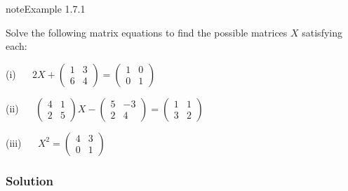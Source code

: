 \documentclass[letterpaper,10pt,english]{jupyterBook}
\begin{document}
\begin{sphinxadmonition}{note}{Example 1.7.1}



\sphinxAtStartPar
Solve the following matrix equations to find the possible matrices \(X\) satisfying each:

\sphinxAtStartPar
(i)   \(2X + \begin{pmatrix} 1 & 3 \\ 6 & 4 \end{pmatrix} = \begin{pmatrix} 1 & 0 \\ 0 & 1 \end{pmatrix}\)

\sphinxAtStartPar
(ii)   \(\begin{pmatrix} 4 & 1 \\ 2 & 5 \end{pmatrix} X - \begin{pmatrix} 5 & -3 \\ 2 & 4 \end{pmatrix} = \begin{pmatrix} 1 & 1 \\ 3 & 2 \end{pmatrix}\)

\sphinxAtStartPar
(iii)   \(X^2 = \begin{pmatrix} 4 & 3 \\ 0 & 1 \end{pmatrix}\)
\subsubsection*{Solution}


\end{sphinxadmonition}
\end{document}
